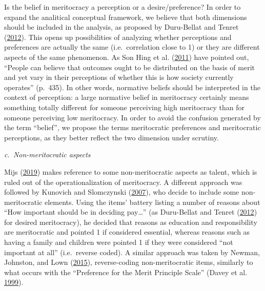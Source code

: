 \documentclass[
]{article}
\begin{document}
Is the belief in meritocracy a perception or a desire/preference? In order to expand the analitical conceptual framework, we believe that both dimensions should be included in the analysis, as proposed by Duru-Bellat and Tenret (\protect\hyperlink{ref-duru-bellat_whos_2012}{2012}). This opens up possibilities of analyzing whether perceptions and preferences are actually the same (i.e.~correlation close to 1) or they are different aspects of the same phenomenon. As Son Hing et al. (\protect\hyperlink{ref-son_hing_merit_2011-1}{2011}) have pointed out, ``People can believe that outcomes ought to be distributed on the basis of merit and yet vary in their perceptions of whether this is how society currently operates'' (p.~435). In other words, normative beliefs should be interpreted in the context of perception: a large normative belief in meritocracy certainly means something totally different for someone perceiving high meritocracy than for someone perceiving low meritocracy. In order to avoid the confusion generated by the term ``belief'', we propose the terms meritocratic preferences and meritocratic perceptions, as they better reflect the two dimension under scrutiny.

\emph{c.~Non-meritocratic aspects}

Mijs (\protect\hyperlink{ref-mijs_paradox_2019}{2019}) makes reference to some non-meritocratic aspects as talent, which is ruled out of the operationalization of meritocracy. A different approach was followed by Kunovich and Slomczynski (\protect\hyperlink{ref-kunovich_systems_2007}{2007}), who decide to include some non-meritocratic elements. Using the items' battery listing a number of reasons about ``How important should be in deciding pay\ldots{}'' (as Duru-Bellat and Tenret (\protect\hyperlink{ref-duru-bellat_whos_2012}{2012}) for desired meritocracy), he decided that reasons as education and responsibility are meritocratic and pointed 1 if considered essential, whereas reasons such as having a family and children were pointed 1 if they were considered ``not important at all'' (i.e.~reverse coded). A similar approach was taken by Newman, Johnston, and Lown (\protect\hyperlink{ref-newman_false_2015}{2015}), reverse-coding non-meritocratic items, similarly to what occurs with the ``Preference for the Merit Principle Scale'' (Davey et al. \protect\hyperlink{ref-davey_preference_1999}{1999}).
\end{document}
